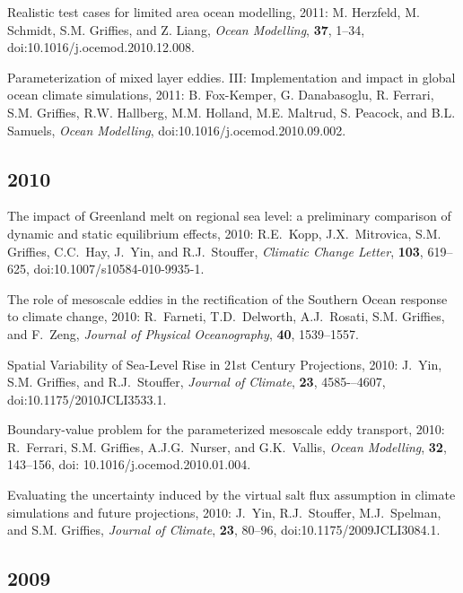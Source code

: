 \begin{etaremune}
\item Realistic test cases for limited area ocean modelling, 2011: M. Herzfeld, M. Schmidt, S.M. Grif\/f\/ies, and Z. Liang, {\it    Ocean Modelling}, {\bf 37}, 1--34, doi:10.1016/j.ocemod.2010.12.008.

\item Parameterization of mixed layer eddies. III: Implementation and impact in global ocean climate simulations, 2011: B. Fox-Kemper, G. Danabasoglu, R. Ferrari, S.M. Grif\/f\/ies, R.W. Hallberg, M.M. Holland, M.E. Maltrud, S. Peacock, and B.L. Samuels, {\it Ocean Modelling}, doi:10.1016/j.ocemod.2010.09.002.

\subsection*{\sc \color{Maroon} 2010}

\item The impact of Greenland melt on regional sea level: a preliminary comparison of dynamic and static equilibrium effects, 2010: R.E.\ Kopp, J.X.\ Mitrovica, S.M. Grif\/f\/ies, C.C.\  Hay, J.\ Yin, and R.J.\ Stouffer, {\it Climatic Change Letter}, {\bf 103}, 619--625, doi:10.1007/s10584-010-9935-1.

\item The role of mesoscale eddies in the rectification of the Southern Ocean response to climate change, 2010: R.\ Farneti, T.D.\  Delworth, A.J.\ Rosati, S.M. Grif\/f\/ies, and F.\ Zeng, {\it Journal of Physical Oceanography}, {\bf 40}, 1539--1557.

\item Spatial Variability of Sea-Level Rise in 21st Century Projections, 2010: J.\ Yin, S.M. Grif\/f\/ies, and R.J.\ Stouffer, {\it Journal of Climate}, {\bf 23}, 4585-–4607, doi:10.1175/2010JCLI3533.1.

\item Boundary-value problem for the parameterized mesoscale eddy transport, 2010: R.\ Ferrari, S.M. Grif\/f\/ies, A.J.G.\  Nurser, and G.K.\ Vallis, {\em Ocean Modelling}, {\bf 32}, 143--156, doi: 10.1016/j.ocemod.2010.01.004.

\item Evaluating the uncertainty induced by the virtual salt flux assumption in climate simulations and future projections, 2010: J.\  Yin, R.J.\ Stouffer, M.J.\ Spelman, and S.M. Grif\/f\/ies, {\em Journal of Climate}, {\bf 23}, 80--96, doi:10.1175/2009JCLI3084.1. 

\subsection*{\sc \color{Maroon} 2009}



\end{etaremune}
